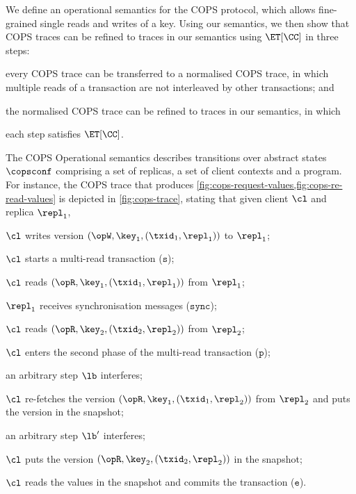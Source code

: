 We define an operational semantics for the COPS protocol, which allows fine-grained single reads and writes of a key.
Using our semantics, we then show that COPS traces can be refined to traces in our semantics using \( \ET[\CC] \) in three steps:
\begin{enumerate*}
\item every COPS trace can be transferred to a normalised COPS trace, 
in which multiple reads of a transaction are not interleaved by other transactions; and
\item the normalised COPS trace can be refined to traces in our semantics, in which \item each step satisfies \( \ET[\CC] \).
\end{enumerate*}

The COPS Operational semantics
describes transitions over abstract states \( \copsconf \) comprising a set of replicas,
a set of client contexts and a program.
For instance, the COPS trace that produces \cref{fig:cops-request-values,fig:cops-re-read-values} is depicted in \cref{fig:cops-trace}, stating that
given client \(\cl\) and replica \( \repl_1 \),
\begin{enumerate*}
\item \( \cl \) writes version \( (\opW,\key_1, (\txid_1,\repl_1)) \) to $\repl_1$;
\item \( \cl \) starts a multi-read transaction (\( \mathtt{s} \));
\item \( \cl \) reads  \( (\opR,\key_1, (\txid_1,\repl_1)) \) from $\repl_1$;
\item \( \repl_1 \) receives synchronisation messages (\(\mathtt{sync}\));
\item \( \cl \) reads  \( (\opR,\key_2, (\txid_2,\repl_2)) \) from $\repl_2$;
\item \( \cl \) enters the second phase of the multi-read transaction (\(\mathtt{p}\));
\item an arbitrary step \( \lb \) interferes;
\item \( \cl \) re-fetches the version \( (\opR,\key_1, (\txid_1,\repl_2)) \) from \( \repl_2 \) and puts the version in the snapshot;
\item an arbitrary step \( \lb' \) interferes;
\item \( \cl \) puts the version \( (\opR,\key_2, (\txid_2,\repl_2)) \) in the snapshot;
\item \( \cl \) reads the values in the snapshot and commits the transaction (\(\mathtt{e}\)).
\end{enumerate*}

